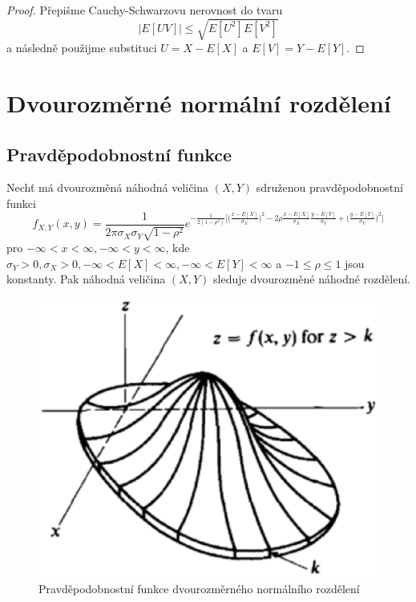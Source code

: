 \begin{proof}
Přepišme Cauchy-Schwarzovu nerovnost do tvaru
\begin{equation*}
|E[UV]| \le \sqrt{E[U^2]E[V^2]}
\end{equation*}
a následně použijme substituci $U = X - E[X]$ a $E[V] = Y - E[Y]$.
\end{proof}

\section{Dvourozměrné normální rozdělení}

\subsection{Pravděpodobnostní funkce}

\begin{definition}
Nechť má dvourozměná náhodná veličina $(X,Y)$ sdruženou pravděpodobnostní funkci
\begin{equation*}
f_{X,Y}(x,y) = \frac{1}{2 \pi \sigma_X \sigma_Y \sqrt{1 - \rho^2}} e^{-\frac{1}{2(1 - \rho^2)}\big[\big(\frac{x - E[X]}{\sigma_X} \big)^2 - 2 \rho \frac{x - E[X]}{\sigma_X}\frac{y - E[Y]}{\sigma_Y} + \big(\frac{y - E[Y]}{\sigma_Y} \big)^2 \big]}
\end{equation*}
pro $-\infty < x < \infty, -\infty < y < \infty$, kde $\sigma_Y > 0, \sigma_X > 0, -\infty < E[X] < \infty, -\infty < E[Y] <  \infty$ a $-1 \le \rho \le 1$ jsou konstanty. Pak náhodná veličina $(X,Y)$ sleduje dvourozměné náhodné rozdělení. 
\end{definition}

\begin{figure}[htp]
\centering
\includegraphics[scale = 0.5]{pictures/bivariate_normal.eps}
\caption{Pravděpodobnostní funkce dvourozměrného normálního rozdělení}
\label{bivariate_normal}
\end{figure}


